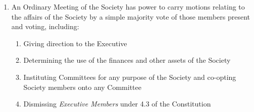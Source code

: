 \documentclass[11pt]{article}
\begin{document}
\begin{enumerate}[\thesection .1]
    \item An Ordinary Meeting of the Society has power to carry motions relating to the affairs of the Society by a simple majority vote of those members present and voting, including:
    \begin{enumerate}[\hspace{5mm}i)]
        \item Giving direction to the Executive
        \item Determining the use of the finances and other assets of the Society
        \item Instituting Committees for any purpose of the Society and co-opting Society members onto any Committee
        \item Dismissing \textit{Executive Members} under 4.3 of the Constitution
    \end{enumerate}
\end{enumerate}
\end{document}
